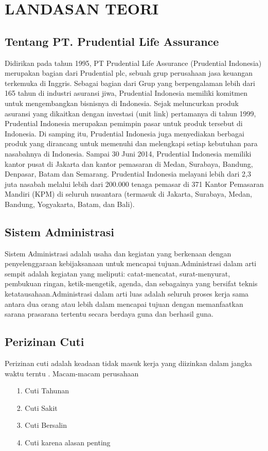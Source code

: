 \documentclass{jtetiproposalskripsi}
\begin{document}
\chapter{LANDASAN TEORI}

\section{Tentang PT. Prudential Life Assurance}

	Didirikan pada tahun 1995, PT Prudential Life Assurance (Prudential Indonesia) merupakan bagian dari Prudential plc, sebuah grup perusahaan jasa keuangan terkemuka di Inggris. Sebagai bagian dari Grup yang berpengalaman lebih dari 165 tahun di industri asuransi jiwa, Prudential Indonesia memiliki komitmen untuk mengembangkan bisnisnya di Indonesia. Sejak meluncurkan produk asuransi yang dikaitkan dengan investasi (unit link) pertamanya di tahun 1999, Prudential Indonesia merupakan pemimpin pasar untuk produk tersebut di Indonesia. Di samping itu, Prudential Indonesia juga menyediakan berbagai produk yang dirancang untuk memenuhi dan melengkapi setiap kebutuhan para nasabahnya di Indonesia.	
Sampai 30 Juni 2014, Prudential Indonesia memiliki kantor pusat di Jakarta dan kantor pemasaran di Medan, Surabaya, Bandung, Denpasar, Batam dan Semarang. Prudential Indonesia melayani lebih dari 2,3 juta nasabah melalui lebih dari 200.000 tenaga pemasar di 371 Kantor Pemasaran Mandiri (KPM) di seluruh nusantara (termasuk di Jakarta, Surabaya, Medan, Bandung, Yogyakarta, Batam, dan Bali).
\section{Sistem Administrasi}

	Sistem Administrasi  adalah usaha dan kegiatan yang berkenaan dengan penyelenggaraan kebijaksanaan untuk mencapai tujuan.Administrasi dalam arti sempit adalah kegiatan yang meliputi: catat-mencatat, surat-menyurat, pembukuan ringan, ketik-mengetik, agenda, dan sebagainya yang bersifat teknis ketatausahaan.Administrasi dalam arti luas adalah seluruh proses kerja sama antara dua orang atau lebih dalam mencapai tujuan dengan memanfaatkan sarana prasarana tertentu secara berdaya guna dan berhasil guna.
\section{Perizinan Cuti}
Perizinan cuti adalah keadaan tidak masuk kerja yang diizinkan dalam jangka waktu terntu .
Macam-macam perusahaan
\begin{itemize}
\item[1.] Cuti Tahunan
\item[2.] Cuti Sakit
\item[3.] Cuti Bersalin
\item[4.]	Cuti karena alasan penting
\end{itemize}
\end{document}
